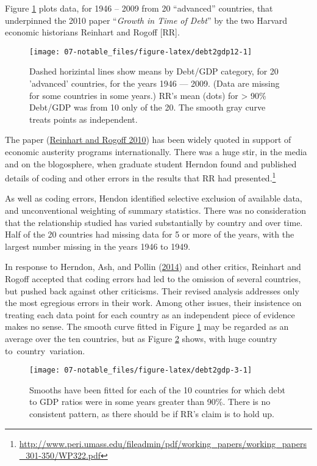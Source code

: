 \documentclass[
  10ptls,
  b5paper]{book}
\begin{document}
Figure \ref{fig:debt2gdp12} plots data, for 1946 -- 2009
from 20 ``advanced'' countries, that underpinned the 2010
paper ``\emph{Growth in Time of Debt}'' by the two Harvard economic
historians Reinhart and Rogoff {[}RR{]}.

\begin{figure}[H]

{\centering \texttt{[image: 07-notable\_files/figure-latex/debt2gdp12-1]} 

}

\caption{Dashed horizintal lines show means by Debt/GDP category, 
for 20 'advanced' countries, for the years 1946 --- 2009.
(Data are missing for some countries in some years.)
RR's mean (dots) for > 90\% Debt/GDP was from 10 only of the 20. 
The smooth gray curve treats points as independent.}\label{fig:debt2gdp12}
\end{figure}

The paper (\protect\hyperlink{ref-reinhart2010growth}{Reinhart and Rogoff 2010})
has been widely quoted in support of economic austerity programs
internationally. There was a huge stir, in the media and on the
blogosphere, when graduate student Herndon found and published
details of coding and other errors in the results that RR had
presented.\footnote{\url{http://www.peri.umass.edu/fileadmin/pdf/working_papers/working_papers_301-350/WP322.pdf}}

As well as coding errors, Hendon identified selective exclusion of
available data, and unconventional weighting of summary statistics.
There was no consideration that the relationship studied has varied
substantially by country and over time. Half of the 20 countries
had missing data for 5 or more of the years, with the largest
number missing in the years 1946 to 1949.

In response to Herndon, Ash, and Pollin (\protect\hyperlink{ref-herndon2014does}{2014}) and other critics, Reinhart and
Rogoff accepted that coding errors had led to the omission of
several countries, but pushed back against other criticisms.
Their revised analysis addresses only the most egregious errors
in their work. Among other issues, their insistence on treating
each data point for each country as an independent piece of
evidence makes no sense. The smooth curve fitted in Figure
\ref{fig:debt2gdp12} may be regarded as an average over the
ten countries, but as Figure \ref{fig:debt2gdp-3} shows, with
huge country to~country~variation.

\begin{figure}[H]

{\centering \texttt{[image: 07-notable\_files/figure-latex/debt2gdp-3-1]} 

}

\caption{Smooths have been fitted for each of the 10 countries
for which debt to GDP ratios were in some years greater than 90\%.
There is no consistent pattern, as there should be if RR's claim
is to hold up.}\label{fig:debt2gdp-3}
\end{figure}
\end{document}
